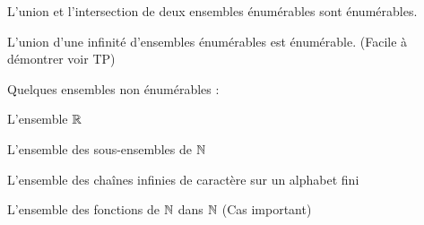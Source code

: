 \begin{myprop}
L'union et l'intersection de deux ensembles énumérables sont énumérables.
\end{myprop}

\begin{myprop}
L'union d'une infinité d'ensembles énumérables est énumérable. (Facile à
		démontrer voir TP)
\end{myprop}

Quelques ensembles non énumérables : 
\begin{myexem}
 L'ensemble $\mathbb{R}$
\end{myexem}

\begin{myexem}
 L'ensemble des sous-ensembles de $\mathbb{N}$
\end{myexem}

\begin{myexem}
 L'ensemble des chaînes infinies de caractère sur un alphabet fini
\end{myexem}

\begin{myexem}
 L'ensemble des fonctions de $\mathbb{N}$ dans $\mathbb{N}$ (Cas important)
\end{myexem}


